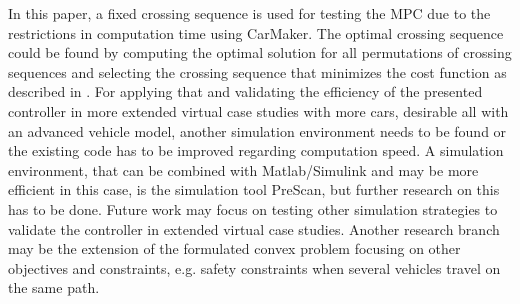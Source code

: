 \documentclass[letterpaper,10pt,conference]{ieeeconf}
\begin{document}
In this paper, a fixed crossing sequence is used for testing the MPC due to the restrictions in computation time using CarMaker. The optimal crossing sequence could be found by computing the optimal solution for all permutations of crossing sequences and selecting the crossing sequence that minimizes the cost function as described in \cite{nikolce}. For applying that and validating the efficiency of the presented controller in more extended virtual case studies with more cars, desirable all with an advanced vehicle model, another simulation environment needs to be found or the existing code has to be improved regarding computation speed. A simulation environment, that can be combined with Matlab/Simulink and may be more efficient in this case, is the simulation tool PreScan, but further research on this has to be done. Future work may focus on testing other simulation strategies to validate the controller in extended virtual case studies. Another research branch may be the extension of the formulated convex problem focusing on other objectives and constraints, e.g. safety constraints when several vehicles travel on the same path. 


\end{document}
